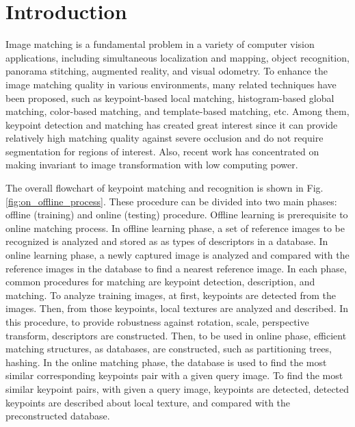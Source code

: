 
\section{Introduction}
\label{sec:intro}

Image matching is a fundamental problem in a variety of computer vision applications, including simultaneous localization and mapping\cite{chang_p-slam:_2007,davison_monoslam:_2007}, object recognition\cite{nister_scalable_2006}, panorama stitching\cite{brown_recognising_2003,wagner_real-time_2010}, augmented reality\cite{klein_parallel_2007,wagner_multiple_2009}, and visual odometry\cite{cheng_visual_2006,nister_visual_2004}. To enhance the image matching quality in various environments, many related techniques have been proposed, such as keypoint-based local matching, histogram-based global matching\cite{le_improving_2013,goncalves_hairis:_2011}, color-based matching\cite{mehtre_color_1995,kankanhalli_cluster-based_1996}, and template-based matching\cite{korman_fast-match:_2013}, etc. Among them, keypoint detection and matching has created great interest since it can provide relatively high matching quality against severe occlusion and do not require segmentation for regions of interest. Also, recent work has concentrated on making invariant to image transformation with low computing power\cite{carrera_robust_2007,mikolajczyk_performance_2005}.

The overall flowchart of keypoint matching and recognition is shown in Fig. \ref{fig:on_offline_process}. These procedure can be divided into two main phases: offline (training) and online (testing) procedure. Offline learning is prerequisite to online matching process. In offline learning phase, a set of reference images to be recognized is analyzed and stored as as types of descriptors in a database. In online learning phase, a newly captured image is analyzed and compared with the reference images in the database to find a nearest reference image. In each phase, common procedures for matching are keypoint detection, description, and matching. To analyze training images, at first, keypoints are detected from the images. Then, from those keypoints, local textures are analyzed and described. In this procedure, to provide robustness against rotation, scale, perspective transform, descriptors are constructed. Then, to be used in online phase, efficient matching structures, as databases, are constructed, such as partitioning trees\cite{arya_optimal_1998,beis_shape_1997,muja_fast_2012}, hashing\cite{salakhutdinov_semantic_2009,gionis_similarity_1999,lv_multi-probe_2007}. In the online matching phase, the database is used to find the most similar corresponding keypoints pair with a given query image. To find the most similar keypoint pairs, with given a query image, keypoints are detected, detected keypoints are described about local texture, and compared with the preconstructed database.


